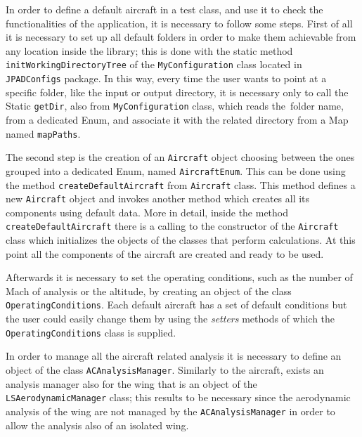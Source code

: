 \bigskip
\noindent
In order to define a default aircraft in a test class, and use it to check the functionalities of the application, it is necessary to follow some steps. First of all it is necessary to set up all default folders in order to make them achievable from any location inside the library; this is done with the static method \lstinline[language=Java]!initWorkingDirectoryTree! of the \lstinline[language=Java]!MyConfiguration! class located in \lstinline[language=Java]!JPADConfigs! package. In this way, every time the user wants to point at a specific folder, like the input or output directory, it is necessary only to call the \gls{Static} \lstinline[language=Java]!getDir!, also from \lstinline[language=Java]!MyConfiguration! class, which reads the~folder name, from a dedicated \gls{Enum}, and associate it with the related directory from a \gls{Map} named \lstinline[language=Java]!mapPaths!.

\bigskip
\noindent
The second step is the creation of an \lstinline[language=Java]!Aircraft! object choosing between the ones grouped into a dedicated \gls{Enum}, named \lstinline[language=Java]!AircraftEnum!. This can be done using the method \lstinline[language=Java]!createDefaultAircraft! from \lstinline[language=Java]!Aircraft! class. This method defines a new \lstinline[language=Java]!Aircraft! object and invokes another method which creates all its components using default data. More in detail, inside the method \lstinline[language=Java]!createDefaultAircraft! there is a calling to the constructor of the \lstinline[language=Java]!Aircraft! class which initializes the objects of the classes that perform calculations. At this point all the components of the aircraft are created and ready to be used.

\bigskip
\noindent
Afterwards it is necessary to set the operating conditions, such as the number of Mach of analysis or the altitude, by creating an object of the class \lstinline[language=Java]!OperatingConditions!. Each default aircraft has a set of default conditions but the user could easily change them by using the \emph{setters} methods of which the \lstinline[language=Java]!OperatingConditions! class is supplied.

\bigskip
\noindent
In order to manage all the aircraft related analysis it is necessary to define an object of the class \lstinline[language=Java]!ACAnalysisManager!. Similarly to the aircraft, exists an analysis manager also for the wing that is an object of the \lstinline[language=Java]!LSAerodynamicManager! class; this results to be necessary since the aerodynamic analysis of the wing are not managed by the \lstinline[language=Java]!ACAnalysisManager! in order to allow the analysis also of an isolated wing.

